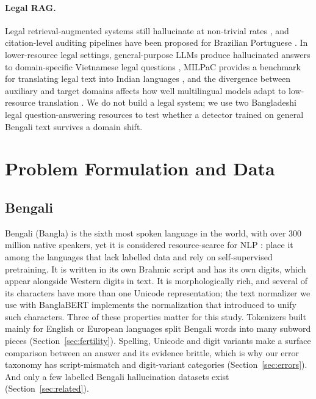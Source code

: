 \documentclass[manuscript,screen,review]{acmart}
\begin{document}
\paragraph{Legal RAG.}
Legal retrieval-augmented systems still hallucinate at non-trivial rates \cite{magesh2025hallucination,das2026legalrag}, and citation-level auditing pipelines have been proposed for Brazilian Portuguese \cite{figueiredo2026grounded}. In lower-resource legal settings, general-purpose LLMs produce hallucinated answers to domain-specific Vietnamese legal questions \cite{le2025vietlegal}, MILPaC provides a benchmark for translating legal text into Indian languages \cite{mahapatra2025milpac}, and the divergence between auxiliary and target domains affects how well multilingual models adapt to low-resource translation \cite{ranathunga2026domain}. We do not build a legal system; we use two Bangladeshi legal question-answering resources \cite{banglagovragRepo,bdlegalqaRepo} to test whether a detector trained on general Bengali text survives a domain shift.

\section{Problem Formulation and Data}\label{sec:data}
\subsection{Bengali}\label{sec:bengali}
Bengali (Bangla) is the sixth most spoken language in the world, with over 300 million native speakers, yet it is considered resource-scarce for NLP \cite{bhattacharjee2022banglabert}: \citet{joshi2020state} place it among the languages that lack labelled data and rely on self-supervised pretraining. It is written in its own Brahmic script and has its own digits, which appear alongside Western digits in text. It is morphologically rich, and several of its characters have more than one Unicode representation; the text normalizer we use with BanglaBERT \cite{bhattacharjee2022banglabert} implements the normalization that \citet{hasan2020notlowresource} introduced to unify such characters. Three of these properties matter for this study. Tokenizers built mainly for English or European languages split Bengali words into many subword pieces (Section~\ref{sec:fertility}). Spelling, Unicode and digit variants make a surface comparison between an answer and its evidence brittle, which is why our error taxonomy has script-mismatch and digit-variant categories (Section~\ref{sec:errors}). And only a few labelled Bengali hallucination datasets exist (Section~\ref{sec:related}).
\end{document}
